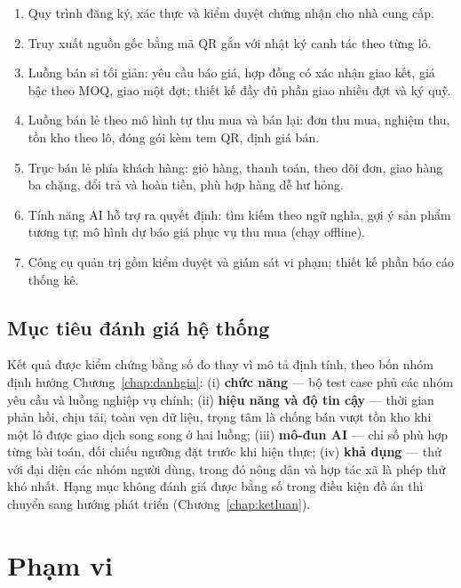 \begin{enumerate}
    \item[\textbf{MT1.}] Quy trình đăng ký, xác thực và kiểm duyệt chứng nhận cho nhà cung cấp.
    \item[\textbf{MT2.}] Truy xuất nguồn gốc bằng mã QR gắn với nhật ký canh tác theo từng lô.
    \item[\textbf{MT3.}] Luồng bán sỉ tối giản: yêu cầu báo giá, hợp đồng có xác nhận giao kết, giá bậc theo MOQ, giao một đợt; thiết kế đầy đủ phần giao nhiều đợt và ký quỹ.
    \item[\textbf{MT4.}] Luồng bán lẻ theo mô hình tự thu mua và bán lại: đơn thu mua, nghiệm thu, tồn kho theo lô, đóng gói kèm tem QR, định giá bán.
    \item[\textbf{MT5.}] Trục bán lẻ phía khách hàng: giỏ hàng, thanh toán, theo dõi đơn, giao hàng ba chặng, đổi trả và hoàn tiền, phù hợp hàng dễ hư hỏng.
    \item[\textbf{MT6.}] Tính năng AI hỗ trợ ra quyết định: tìm kiếm theo ngữ nghĩa, gợi ý sản phẩm tương tự; mô hình dự báo giá phục vụ thu mua (chạy offline).
    \item[\textbf{MT7.}] Công cụ quản trị gồm kiểm duyệt và giám sát vi phạm; thiết kế phần báo cáo thống kê.
\end{enumerate}

\subsection{Mục tiêu đánh giá hệ thống}
\label{sec:muctieudanhgia}

Kết quả được kiểm chứng bằng số đo thay vì mô tả định tính, theo bốn nhóm định hướng Chương~\ref{chap:danhgia}: (i) \textbf{chức năng} --- bộ test case phủ các nhóm yêu cầu và luồng nghiệp vụ chính; (ii) \textbf{hiệu năng và độ tin cậy} --- thời gian phản hồi, chịu tải, toàn vẹn dữ liệu, trọng tâm là chống bán vượt tồn kho khi một lô được giao dịch song song ở hai luồng; (iii) \textbf{mô-đun AI} --- chỉ số phù hợp từng bài toán, đối chiếu ngưỡng đặt trước khi hiện thực; (iv) \textbf{khả dụng} --- thử với đại diện các nhóm người dùng, trong đó nông dân và hợp tác xã là phép thử khó nhất. Hạng mục không đánh giá được bằng số trong điều kiện đồ án thì chuyển sang hướng phát triển (Chương~\ref{chap:ketluan}).

\section{Phạm vi}
\label{sec:phamvi}

